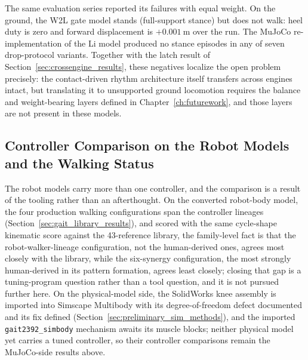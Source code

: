 The same evaluation series reported its failures with equal weight. On the ground, the W2L gate model stands (full-support stance) but does not walk: heel duty is zero and forward displacement is $+\qty{0.001}{\meter}$ over the run. The MuJoCo re-implementation of the Li model produced no stance episodes in any of seven drop-protocol variants. Together with the latch result of Section~\ref{sec:crossengine_results}, these negatives localize the open problem precisely: the contact-driven rhythm architecture itself transfers across engines intact, but translating it to unsupported ground locomotion requires the balance and weight-bearing layers defined in Chapter~\ref{ch:futurework}, and those layers are not present in these models.

\subsection{Controller Comparison on the Robot Models and the Walking Status}\label{sec:sns_controller_comparison}

The robot models carry more than one controller, and the comparison is a result of the tooling rather than an afterthought. On the converted robot-body model, the four production walking configurations span the controller lineages (Section~\ref{sec:gait_library_results}), and scored with the same cycle-shape kinematic score against the 43-reference library, the family-level fact is that the robot-walker-lineage configuration, not the human-derived ones, agrees most closely with the library, while the six-synergy configuration, the most strongly human-derived in its pattern formation, agrees least closely; closing that gap is a tuning-program question rather than a tool question, and it is not pursued further here. On the physical-model side, the SolidWorks knee assembly is imported into Simscape Multibody with its degree-of-freedom defect documented and its fix defined (Section~\ref{sec:preliminary_sim_methods}), and the imported \texttt{gait2392\_simbody} mechanism awaits its muscle blocks; neither physical model yet carries a tuned controller, so their controller comparisons remain the MuJoCo-side results above.

